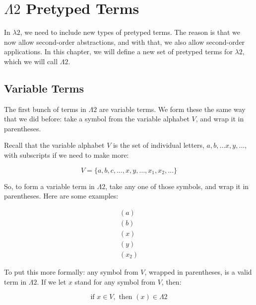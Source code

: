 \documentclass{book}
\numberwithin{equation}{chapter}
\begin{document}
\chapter{$\Lambda2$ Pretyped Terms}

In $\lambda 2$, we need to include new types of pretyped terms. The reason is that we now allow second-order abstractions, and with that, we also allow second-order applications. In this chapter, we will define a new set of pretyped terms for $\lambda 2$, which we will call $\Lambda 2$.


\section{Variable Terms}

The first bunch of terms in $\Lambda 2$ are variable terms. We form these the same way that we did before: take a symbol from the variable alphabet $V$, and wrap it in parentheses.

Recall that the variable alphabet $V$ is the set of individual letters, $a, b, \ldots x, y, \ldots$, with subscripts if we need to make more:

\begin{equation}
V = \{ a, b, c, \ldots, x, y, \ldots, x_{1}, x_{2}, \ldots \}
\end{equation}

\noindent
So, to form a variable term in $\Lambda 2$, take any one of those symbols, and wrap it in parentheses. Here are some examples:

\begin{align}
  (a) \\
  (b) \\
  (x) \\
  (y) \\
  (x_{2})
\end{align}

\noindent
To put this more formally: any symbol from $V$, wrapped in parentheses, is a valid term in $\Lambda 2$. If we let $x$ stand for any symbol from $V$, then:

\begin{equation}
\text{if } x \in V, \text{ then } (x) \in \Lambda 2
\end{equation}
\end{document}
